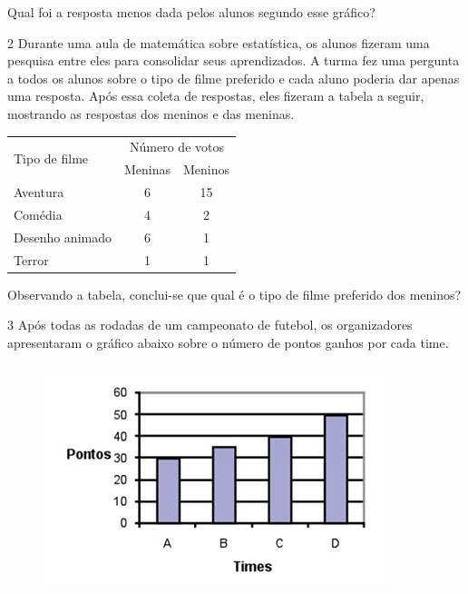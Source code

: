 Qual foi a resposta menos dada pelos alunos segundo esse gráfico?


\num{2} Durante uma aula de matemática sobre estatística, os alunos fizeram
uma pesquisa entre eles para consolidar seus aprendizados. A turma fez
uma pergunta a todos os alunos sobre o tipo de filme preferido e cada
aluno poderia dar apenas uma resposta. Após essa coleta de respostas,
eles fizeram a tabela a seguir, mostrando as respostas dos meninos e das meninas.

\begin{center}
\begin{tabular}{l|cc}
\hline
\multirow{2}{*}{Tipo de filme} & \multicolumn{2}{c}{Número de votos} \\ \cline{2-3} 
 & \multicolumn{1}{c|}{Meninas} & Meninos \\ \hline
Aventura & \multicolumn{1}{c|}{6} & 15 \\ \hline
Comédia & \multicolumn{1}{c|}{4} & 2 \\ \hline
Desenho animado & \multicolumn{1}{c|}{6} & 1 \\ \hline
Terror & \multicolumn{1}{c|}{1} & 1 \\ \hline
\end{tabular}
\end{center}

Observando a tabela, conclui-se que qual é o tipo de filme preferido dos meninos?


\num{3} Após todas as rodadas de um campeonato de futebol, os organizadores
apresentaram o gráfico abaixo sobre o número de pontos ganhos por cada time.

\begin{figure}[htpb!]
\centering
\includegraphics[width=\textwidth]{./imgs/mat12.png}
\end{figure}

